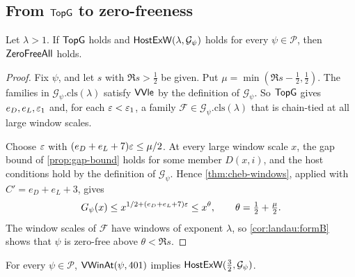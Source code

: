 \subsection{From \texorpdfstring{$\mathsf{TopG}$}{TopG} to zero-freeness}

\begin{theorem}\label{thm:topg-to-zerofree}
Let $\lambda>1$. If $\mathsf{TopG}$ holds and $\mathsf{HostExW}(\lambda,\mathcal G_\psi)$ holds for
every $\psi\in\mathcal P$, then $\mathsf{ZeroFreeAll}$ holds. 
\end{theorem}

\begin{proof}
Fix $\psi$, and let $s$ with $\Re s>\frac12$ be given. Put $\mu=\min(\Re s-\frac12,\frac12)$. The
families in $\mathcal G_\psi.\mathrm{cls}(\lambda)$ satisfy $\mathsf{VVle}$ by the definition of
$\mathcal G_\psi$. So $\mathsf{TopG}$ gives $e_D,e_L,\varepsilon_1$ and, for each $\varepsilon<\varepsilon_1$, a family
$\mathcal F\in\mathcal G_\psi.\mathrm{cls}(\lambda)$ that is chain-tied at all large window scales.

Choose $\varepsilon$ with $(e_D+e_L+7)\varepsilon\le\mu/2$. At every large window scale $x$, the gap bound of
\cref{prop:gap-bound} holds for some member $D(x,i)$, and the host conditions hold by the definition
of $\mathcal G_\psi$. Hence \cref{thm:cheb-windows}, applied with $C'=e_D+e_L+3$, gives
\[
G_\psi(x)\le x^{1/2+(e_D+e_L+7)\varepsilon}\le x^{\theta},\qquad\theta=\tfrac12+\tfrac\mu2.
\]
The window scales of $\mathcal F$ have windows of exponent $\lambda$, so \cref{cor:landau:formB}
shows that $\psi$ is zero-free above $\theta<\Re s$.
\end{proof}

\begin{theorem}\Fmark\label{thm:supply}
For every $\psi\in\mathcal P$, $\mathsf{VWinAt}(\psi,401)$ implies $\mathsf{HostExW}(\frac32,\mathcal G_\psi)$.
\end{theorem}

